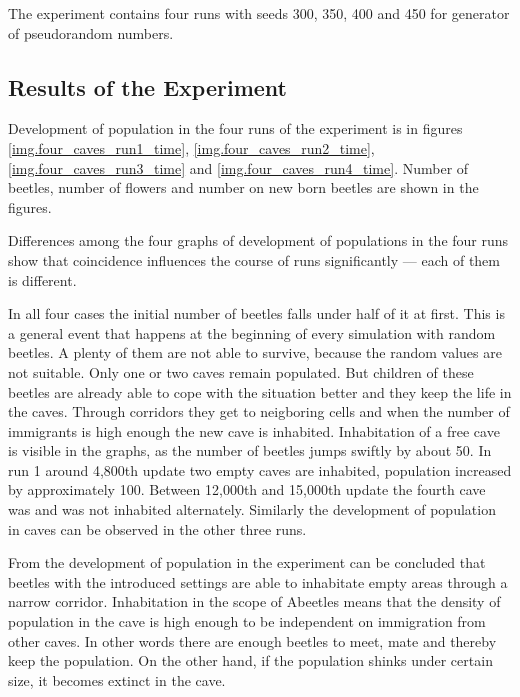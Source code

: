 \documentclass[a4paper,12pt]{report}
\begin{document}
The experiment contains four runs with seeds 300, 350, 400 and 450 for generator of pseudorandom numbers. 



\subsection{Results of the Experiment}

Development of population in the four runs of the experiment is in figures \ref{img.four_caves_run1_time}, \ref{img.four_caves_run2_time}, \ref{img.four_caves_run3_time} and \ref{img.four_caves_run4_time}. Number of beetles, number of flowers and number on new born beetles are shown in the figures.
 
Differences among the four graphs of development of populations in the four runs show that coincidence influences the course of runs significantly --- each of them is different.

In all four cases the initial number of beetles falls under half of it at first. This is a general event that happens at the beginning of every simulation with random beetles. A plenty of them are not able to survive, because the random values are not suitable. Only one or two caves remain populated. But children of these beetles are already able to cope with the situation better and they keep the life in the caves. Through corridors they get to neigboring cells and when the number of immigrants is high enough the new cave is inhabited. Inhabitation of a free cave is visible in the graphs, as the number of beetles jumps swiftly by about 50. In run 1 around 4,800th update two empty caves are inhabited, population increased by approximately 100. Between 12,000th and 15,000th update the fourth cave was and was not inhabited alternately. Similarly the development of population in caves can be observed in the other three runs.
 
From the development of population in the experiment can be concluded that beetles with the introduced settings are able to inhabitate empty areas through a narrow corridor. Inhabitation in the scope of Abeetles means that the density of population in the cave is high enough to be independent on immigration from other caves. In other words there are enough beetles to meet, mate and thereby keep the population. On the other hand, if the population shinks under certain size, it becomes extinct in the cave. 
\end{document}
